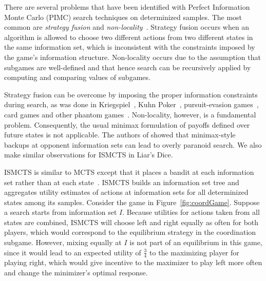 \documentclass[letterpaper]{article}
\begin{document}

There are several problems that have been identified with Perfect Information Monte Carlo (PIMC) search techniques
on determinized samples. The most common are {\it strategy fusion} and {\it non-locality}~\cite{Frank98Finding}.
Strategy fusion occurs when an algorithm is allowed to choose two different actions from two different states in the same 
information set, which is inconsistent with the constraints imposed by the game's information structure. 
Non-locality occurs due to the assumption that subgames are well-defined and that hence search can be 
recursively applied by computing and comparing values of subgames. 

Strategy fusion can be overcome by imposing the proper information constraints during search, as was done in 
Kriegspiel~\cite{Ciancarini10Kriegspiel}, Kuhn Poker~\cite{Ponsen11Computing}, pursuit-evasion games~\cite{Lisy12peg}, 
card games and other phantom games~\cite{Cowling12ISMCTS}. 
Non-locality, however, is a fundamental problem.
Consequently, the usual minimax formulation of payoffs defined over future states is not applicable.  
The authors of \cite{Parker10iss,Parker06Overconfidence} showed that minimax-style backups at opponent information 
sets can lead to overly paranoid search. 
We also make similar observations for ISMCTS in Liar's Dice. 

ISMCTS is similar to MCTS except that it places a bandit at each information set rather than at each 
state~\cite{Cowling12ISMCTS}. ISMCTS builds an information set tree and aggregates utility estimates of actions 
at information sets for all determinized states among its samples. 
Consider the game in Figure~\ref{fig:coordGame}. 
Suppose a search starts from information set $I$. Because utilities for actions taken from all states are combined, 
ISMCTS will choose left and right equally as often for both players, which would correspond to the equilibrium 
strategy in the coordination subgame. However, mixing equally at $I$ is not part of an equilibrium in this game, since
it would lead to an expected utility of $\frac{3}{4}$ to the maximizing player for playing right, which 
would give incentive to the maximizer to play left more often and change the minimizer's optimal response.  
\end{document}
